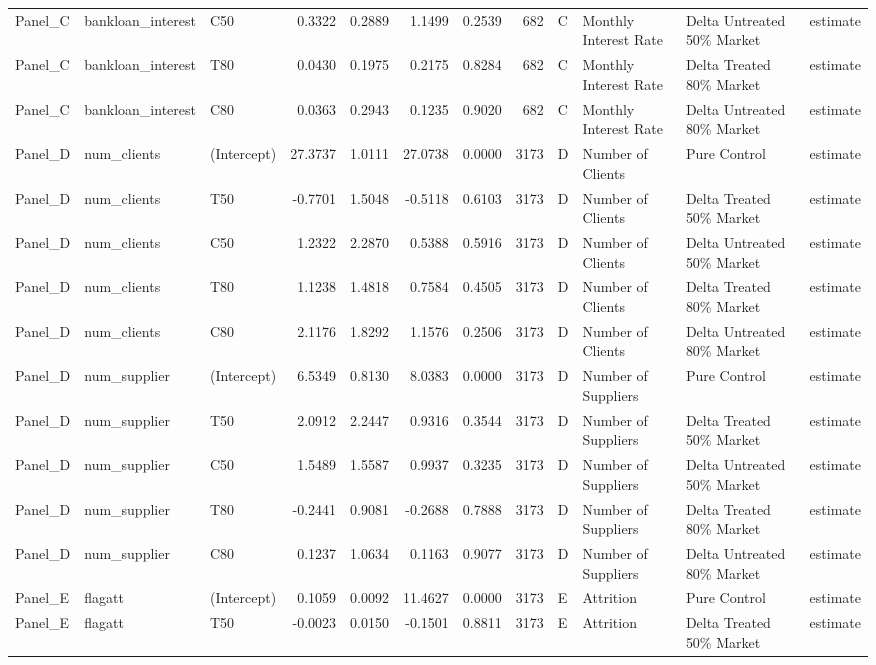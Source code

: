 \begin{table}
\begin{tabular}[t]{lllrrrrrllll}
Panel\_C & bankloan\_interest & C50 & 0.3322 & 0.2889 & 1.1499 & 0.2539 & 682 & C & Monthly Interest Rate & Delta Untreated 50\% Market & estimate\\
Panel\_C & bankloan\_interest & T80 & 0.0430 & 0.1975 & 0.2175 & 0.8284 & 682 & C & Monthly Interest Rate & Delta Treated 80\% Market & estimate\\
Panel\_C & bankloan\_interest & C80 & 0.0363 & 0.2943 & 0.1235 & 0.9020 & 682 & C & Monthly Interest Rate & Delta Untreated 80\% Market & estimate\\
\addlinespace
Panel\_D & num\_clients & (Intercept) & 27.3737 & 1.0111 & 27.0738 & 0.0000 & 3173 & D & Number of Clients & Pure Control & estimate\\
Panel\_D & num\_clients & T50 & -0.7701 & 1.5048 & -0.5118 & 0.6103 & 3173 & D & Number of Clients & Delta Treated 50\% Market & estimate\\
Panel\_D & num\_clients & C50 & 1.2322 & 2.2870 & 0.5388 & 0.5916 & 3173 & D & Number of Clients & Delta Untreated 50\% Market & estimate\\
Panel\_D & num\_clients & T80 & 1.1238 & 1.4818 & 0.7584 & 0.4505 & 3173 & D & Number of Clients & Delta Treated 80\% Market & estimate\\
Panel\_D & num\_clients & C80 & 2.1176 & 1.8292 & 1.1576 & 0.2506 & 3173 & D & Number of Clients & Delta Untreated 80\% Market & estimate\\
\addlinespace
Panel\_D & num\_supplier & (Intercept) & 6.5349 & 0.8130 & 8.0383 & 0.0000 & 3173 & D & Number of Suppliers & Pure Control & estimate\\
Panel\_D & num\_supplier & T50 & 2.0912 & 2.2447 & 0.9316 & 0.3544 & 3173 & D & Number of Suppliers & Delta Treated 50\% Market & estimate\\
Panel\_D & num\_supplier & C50 & 1.5489 & 1.5587 & 0.9937 & 0.3235 & 3173 & D & Number of Suppliers & Delta Untreated 50\% Market & estimate\\
Panel\_D & num\_supplier & T80 & -0.2441 & 0.9081 & -0.2688 & 0.7888 & 3173 & D & Number of Suppliers & Delta Treated 80\% Market & estimate\\
Panel\_D & num\_supplier & C80 & 0.1237 & 1.0634 & 0.1163 & 0.9077 & 3173 & D & Number of Suppliers & Delta Untreated 80\% Market & estimate\\
\addlinespace
Panel\_E & flagatt & (Intercept) & 0.1059 & 0.0092 & 11.4627 & 0.0000 & 3173 & E & Attrition & Pure Control & estimate\\
Panel\_E & flagatt & T50 & -0.0023 & 0.0150 & -0.1501 & 0.8811 & 3173 & E & Attrition & Delta Treated 50\% Market & estimate\\

\end{tabular}
\end{table}
